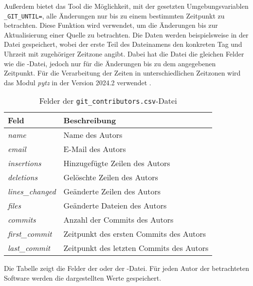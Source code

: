 Außerdem bietet das Tool die Möglichkeit, mit der gesetzten Umgebungsvariablen \texttt{\_GIT\_UNTIL=}, alle Änderungen nur bis zu einem bestimmten Zeitpunkt zu betrachten.
Diese Funktion wird verwendet, um die Änderungen bis zur Aktualisierung einer Quelle zu betrachten.
Die Daten werden beispielsweise in der Datei  gespeichert, wobei der erste Teil des Dateinamens den konkreten Tag und Uhrzeit mit zugehöriger Zeitzone angibt.
Dabei hat die Datei die gleichen Felder wie die -Datei, jedoch nur für die Änderungen bis zu dem angegebenen Zeitpunkt.
Für die Verarbeitung der Zeiten in unterschiedlichen Zeitzonen wird das Modul \emph{pytz} in der Version 2024.2 verwendet \autocite{bishop_pytz_2024}.

\begin{table}
    \begin{tabularx}{\textwidth}{XL{10.2cm}}
        \toprule
        \textbf{Feld}         & \textbf{Beschreibung}                   \\ \midrule
        \emph{name}           & Name des Autors                         \\
        \emph{email}          & E-Mail des Autors                       \\
        \emph{insertions}     & Hinzugefügte Zeilen des Autors          \\
        \emph{deletions}      & Gelöschte Zeilen des Autors             \\
        \emph{lines\_changed} & Geänderte Zeilen des Autors             \\
        \emph{files}          & Geänderte Dateien des Autors            \\
        \emph{commits}        & Anzahl der Commits des Autors           \\
        \emph{first\_commit}  & Zeitpunkt des ersten Commits des Autors \\
        \emph{last\_commit}  & Zeitpunkt des letzten Commits des Autors \\
        \bottomrule
    \end{tabularx}
    \caption{Felder der \texttt{git\_contributors.csv}-Datei}
    \label{tab:git_contributors}
    \small
    Die Tabelle zeigt die Felder der  oder der -Datei. Für jeden Autor der betrachteten Software werden die dargestellten Werte gespeichert.
\end{table}
